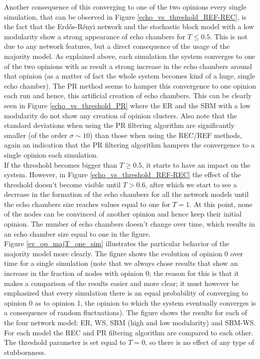 \documentclass[11 pt , letterpaper , twoside , openright]{book}
\begin{document}
Another consequence of this converging to one of the two opinions every single simulation, that can be observed in Figure \ref{echo_vs_threshold_REF-REC}, is the fact that the Erd\H{o}s-R\'{e}nyi network and the stochastic block model with a low modularity show a strong appearance of echo chambers for $T \leqslant 0.5$. This is not due to any network features, but a direct consequence of the usage of the majority model. As explained above, each simulation the system converges to one of the two opinions with as result a strong increase in the echo chambers around that opinion (as a matter of fact the whole system becomes kind of a huge, single echo chamber). The PR method seems to hamper this convergence to one opinion each run and hence, this artificial creation of echo chambers. This can be clearly seen in Figure \ref{echo_vs_threshold_PR} where the ER and the SBM with a low modularity do not show any creation of opinion clusters. Also note that the standard deviations when using the PR filtering algorithm are significantly smaller (of the order $\sigma \sim 10$) than those when using the REC/REF methods, again an indication that the PR filtering algorithm hampers the convergence to a single opinion each simulation.\\
If the threshold becomes bigger than $T \geqslant 0.5$, it starts to have an impact on the system. However, in Figure \ref{echo_vs_threshold_REF-REC} the effect of the threshold doesn't become visible until $T > 0.6$, after which we start to see a decrease in the formation of the echo chambers for all the network models until the echo chambers size reaches values equal to one for $T=1$. At this point, none of the nodes can be convinced of another opinion and hence keep their initial opinion. The number of echo chambers doesn't change over time, which results in an echo chamber size equal to one in the figure.\\
\newline
Figure \ref{ev_op_majT_one_sim} illustrates the particular behavior of the majority model more clearly. The figure shows the evolution of opinion 0 over time for a single simulation (note that we always chose results that show an increase in the fraction of nodes with opinion 0; the reason for this is that it makes a comparison of the results easier and more clear; it must however be emphasized that every simulation there is an equal probability of converging to opinion 0 as to opinion 1, the opinion to which the system eventually converges is a consequence of random fluctuations). The figure shows the results for each of the four network model: ER, WS, SBM (high and low modularity) and SBM-WS. For each model the REC and PR filtering algorithm are compared to each other. The threshold parameter is set equal to $T=0$, so there is no effect of any type of stubbornness.\\
\end{document}
